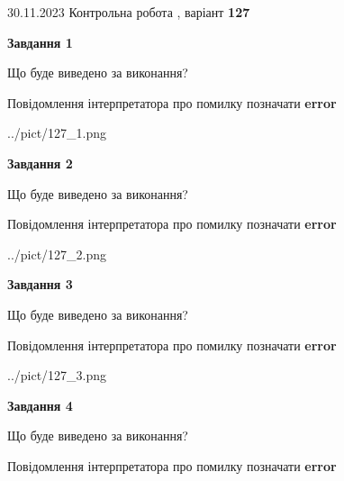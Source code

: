 \documentclass[12pt, ukrainian]{article}
\begin{document}
{{30.11.2023 Контрольна робота , варіант  \No \textbf { 127 }\par}}
{




{\begin {center}\textbf{Завдання 1}\end {center}}\par
Що буде виведено за виконання? \par
Повідомлення інтерпретатора про помилку позначати \textbf{error}

\begin{center}
	{../pict/127_1.png}
\end{center}
\newpage

{\begin {center}\textbf{Завдання 2}\end {center}}\par
Що буде виведено за виконання? \par
Повідомлення інтерпретатора про помилку позначати \textbf{error}

\begin{center}
	{../pict/127_2.png}
\end{center}
\newpage

{\begin {center}\textbf{Завдання 3}\end {center}}\par
Що буде виведено за виконання? \par
Повідомлення інтерпретатора про помилку позначати \textbf{error}

\begin{center}
	{../pict/127_3.png}
\end{center}
\newpage

{\begin {center}\textbf{Завдання 4}\end {center}}\par
Що буде виведено за виконання? \par
Повідомлення інтерпретатора про помилку позначати \textbf{error}

}
\end{document}
